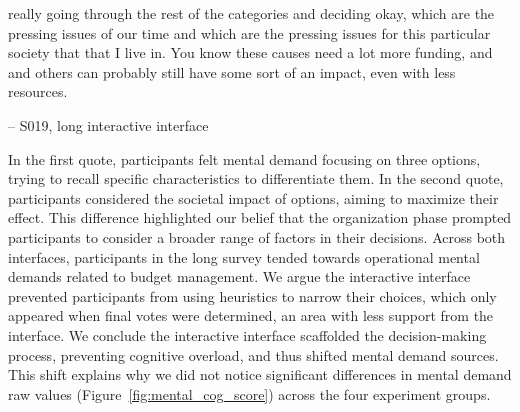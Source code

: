 \begin{displayquote}
\bracketellipsis really going through the rest of the categories and deciding okay, which are the pressing issues of our time and which are the pressing issues for this particular society that that I live in. \bracketellipsis You know these causes need a lot more funding, and and others can probably still have some sort of an impact, even with less resources.

\noindent \hfill -- S019, long interactive interface
\end{displayquote}

In the first quote, participants felt mental demand focusing on three options, trying to recall specific characteristics to differentiate them. In the second quote, participants considered the societal impact of options, aiming to maximize their effect. This difference highlighted our belief that the organization phase prompted participants to consider a broader range of factors in their decisions. Across both interfaces, participants in the long survey tended towards operational mental demands related to budget management. We argue the interactive interface prevented participants from using heuristics to narrow their choices, which only appeared when final votes were determined, an area with less support from the interface. We conclude the interactive interface scaffolded the decision-making process, preventing cognitive overload, and thus shifted mental demand sources. This shift explains why we did not notice significant differences in mental demand raw values (Figure~\ref{fig:mental_cog_score}) across the four experiment groups.






